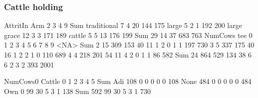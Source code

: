 
\subsubsection{Cattle holding}



\begin{Schunk}
\begin{Soutput}
             AttritIn
Arm             2   3   4   9 Sum
  traditional   7   4  20 144 175
  large         5   2   1 192 200
  large grace  12   3   3 171 189
  cattle        5   5  13 176 199
  Sum          29  14  37 683 763
     NumCows
tee      0    1    2    3    4    5    6    7    8    9 <NA>  Sum
  2     15  309  153   40   11    1    2    0    1    1  197  730
  3      5  337  175   40   16    1    2    2    1    0  110  689
  4      4  218  201   54   11    4    2    0    1    1   86  582
  Sum   24  864  529  134   38    6    6    2    3    2  393 2001
\end{Soutput}
\end{Schunk}
\begin{Schunk}
\begin{Soutput}
      NumCows0
Cattle   0   1   2   3   4   5 Sum
  Adi  108   0   0   0   0   0 108
  None 484   0   0   0   0   0 484
  Own    0  99  30   5   3   1 138
  Sum  592  99  30   5   3   1 730
\end{Soutput}
\end{Schunk}




